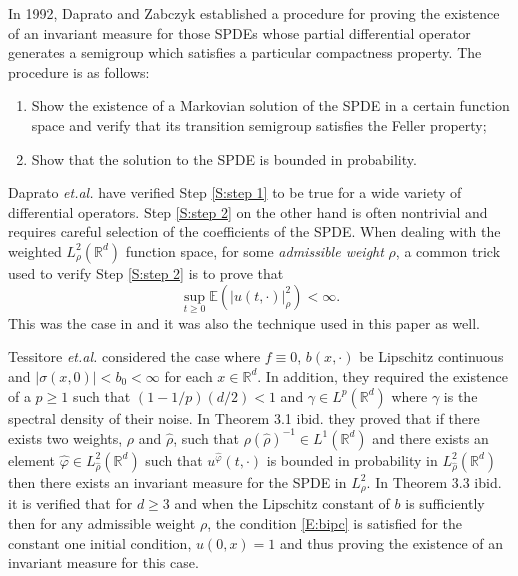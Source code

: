 \documentclass[a4paper,11pt]{article}%
\numberwithin{equation}{section}
\theoremstyle{plain}
\theoremstyle{definition}
\newcommand{\R}{\mathbb{R}}
\begin{document}
In 1992, Daprato and Zabczyk \cite{DZ92} established a procedure for proving the existence of an invariant measure for those SPDEs whose partial differential operator generates a semigroup which satisfies a particular compactness property. The procedure is as follows:
	\begin{enumerate}
		\item \label{S:step 1} Show the existence of a Markovian solution of the SPDE in a certain function space and verify that its transition semigroup satisfies the Feller property;
		\item \label{S:step 2} Show that the solution to the SPDE is bounded in probability.
	\end{enumerate}
Daprato \textit{et.al.} \cite{DZ96} have verified Step \ref{S:step 1} to be true for a wide variety of differential operators. Step \ref{S:step 2} on the other hand is often nontrivial and requires careful selection of the coefficients of the SPDE. When dealing with the weighted $L^2_{\rho}(\R^d)$ function space, for some \textit{admissible weight} $\rho$, a common trick used to verify Step \ref{S:step 2} is to prove that
	\begin{equation}\label{E:bipc}
		\sup_{t \ge 0} \mathbb{E}(|u(t,\cdot)|_\rho^2) < \infty.
	\end{equation}
This was the case in \cite{TessitoreZabczyk98M,AM03,MSY15,MSY16} and it was also the technique used in this paper as well.

Tessitore \textit{et.al.} \cite{TessitoreZabczyk98M} considered the case where $f\equiv 0$, $b(x,\cdot)$ be Lipschitz continuous and $|\sigma(x,0)| < b_0<\infty$ for each $x\in\R^d$.  In addition, they required the existence of a $p\ge1$ such that $(1-1/p)(d/2) < 1$ and $\gamma \in L^p(\R^d)$ where $\gamma$ is the spectral density of their noise. In Theorem 3.1 ibid. they proved that if there exists two weights, $\rho$ and $\hat{\rho}$, such that $\rho(\hat{\rho})^{-1} \in L^1(\R^d)$ and there exists an element $\hat\varphi \in L^2_{\hat{\rho}}(\R^d)$ such that $u^{\hat{\varphi}}(t,\cdot)$ is bounded in probability in $L^2_{\hat{\rho}}(\R^d)$ then there exists an invariant measure for the SPDE in $L^2_{\rho}$. In Theorem 3.3 ibid. it is verified that for $d \ge 3$ and when the Lipschitz constant of $b$ is sufficiently then for any admissible weight $\rho$, the condition \eqref{E:bipc} is satisfied for the constant one initial condition, $u(0,x)=1$ and thus proving the existence of an invariant measure for this case.
\end{document}
